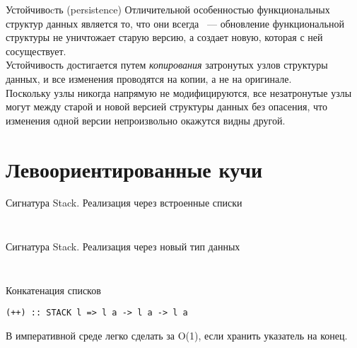 \begin{frame}[fragile]{Устойчивоcть (persistence)}
Отличительной особенностью функциональных структур данных является то,
что они всегда ~--- обновление
функциональной структуры не уничтожает старую версию, а создает
новую, которая с ней сосуществует. \\

Устойчивость достигается путем
\emph{копирования} затронутых узлов структуры данных, и все изменения
проводятся на копии, а не на оригинале. \\

Поскольку узлы никогда
напрямую не модифицируются, все незатронутые узлы могут
 между старой и новой версией структуры
данных без опасения, что изменения одной версии непроизвольно окажутся
видны другой.

\end{frame}


\section{Левоориентированные кучи}
\label{sc:3.1}

\begin{frame}[fragile]{Сигнатура Stack. Реализация через встроенные списки}
\begin{minipage}{.48\textwidth}
\inputminted[firstline=9,lastline=15]{haskell}{code/Stacks.hs}
\end{minipage}
\begin{minipage}{.48\textwidth}
\inputminted{haskell}{code/ListStack.hs}
\end{minipage}
\end{frame}

\begin{frame}[fragile]{Сигнатура Stack. Реализация через новый тип данных}
\begin{minipage}{.48\textwidth}
  \inputminted[firstline=10,lastline=15]{haskell}{code/Stacks.hs}
\end{minipage}
\begin{minipage}{.48\textwidth}
  \inputminted{haskell}{code/CustomStack.hs}
\end{minipage}
\end{frame}

\begin{frame}[fragile]{Конкатенация списков}
\begin{verbatim}
(++) :: STACK l => l a -> l a -> l a
\end{verbatim}
В императивной среде легко сделать за O(1), если хранить указатель на конец.
\end{frame}

